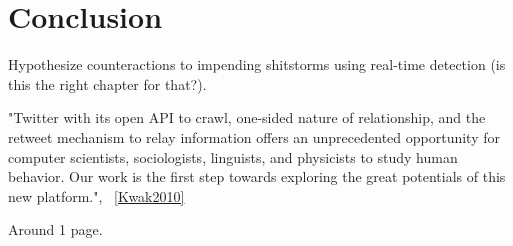 \chapter{Conclusion}
\label{ch:conclusion}

Hypothesize counteractions to impending shitstorms using real-time detection (is this the right chapter for that?).

"Twitter with its open API to crawl, one-sided nature of relationship,
and the retweet mechanism to relay information offers an unprecedented
opportunity for computer scientists, sociologists, linguists,
and physicists to study human behavior. Our work is the first
step towards exploring the great potentials of this new platform.", ~\ref{Kwak2010}

Around 1 page.
\pagebreak[1]

